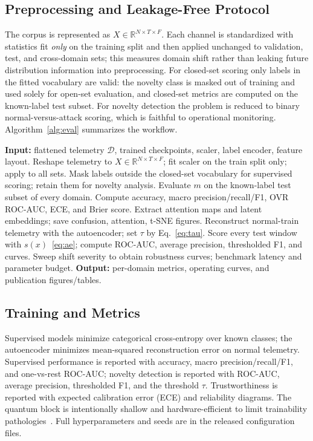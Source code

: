 \documentclass[runningheads]{llncs}
\begin{document}
\subsection{Preprocessing and Leakage-Free Protocol}
The corpus is represented as $X\in\mathbb{R}^{N\times T\times F}$. Each channel is standardized with statistics fit \emph{only} on the training split and then applied unchanged to validation, test, and cross-domain sets; this measures domain shift rather than leaking future distribution information into preprocessing. For closed-set scoring only labels in the fitted vocabulary are valid: the novelty class is masked out of training and used solely for open-set evaluation, and closed-set metrics are computed on the known-label test subset. For novelty detection the problem is reduced to binary normal-versus-attack scoring, which is faithful to operational monitoring. Algorithm~\ref{alg:eval} summarizes the workflow.

\begin{algorithm}[t]
\caption{QSentry telemetry evaluation and cross-domain scoring}
\label{alg:eval}
\begin{algorithmic}[1]
\STATE \textbf{Input:} flattened telemetry $\mathcal{D}$, trained checkpoints, scaler, label encoder, feature layout.
\STATE Reshape telemetry to $X\in\mathbb{R}^{N\times T\times F}$; fit scaler on the train split only; apply to all sets.
\STATE Mask labels outside the closed-set vocabulary for supervised scoring; retain them for novelty analysis.
  \STATE Evaluate $m$ on the known-label test subset of every domain.
  \STATE Compute accuracy, macro precision/recall/F1, OVR ROC-AUC, ECE, and Brier score.
    \STATE Extract attention maps and latent embeddings; save confusion, attention, t-SNE figures.
  \ENDIF
\ENDFOR
\STATE Reconstruct normal-train telemetry with the autoencoder; set $\tau$ by Eq.~\eqref{eq:tau}.
\STATE Score every test window with $s(x)$~\eqref{eq:ae}; compute ROC-AUC, average precision, thresholded F1, and curves.
\STATE Sweep shift severity to obtain robustness curves; benchmark latency and parameter budget.
\STATE \textbf{Output:} per-domain metrics, operating curves, and publication figures/tables.
\end{algorithmic}
\end{algorithm}

\subsection{Training and Metrics}
Supervised models minimize categorical cross-entropy over known classes; the autoencoder minimizes mean-squared reconstruction error on normal telemetry. Supervised performance is reported with accuracy, macro precision/recall/F1, and one-vs-rest ROC-AUC; novelty detection is reported with ROC-AUC, average precision, thresholded F1, and the threshold $\tau$. Trustworthiness is reported with expected calibration error (ECE) and reliability diagrams. The quantum block is intentionally shallow and hardware-efficient to limit trainability pathologies~\cite{mcclean2018barren,larocca2024review}. Full hyperparameters and seeds are in the released configuration files.
\end{document}
